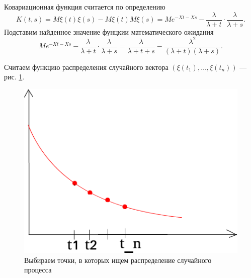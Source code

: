 Ковариационная функция считается по определению
$$K \left( t, s \right) =
  M \xi \left( t \right) \xi \left( s \right) - M \xi \left( t \right) M \xi \left( s \right) =
  Me^{-Xt - Xs} - \frac{ \lambda }{ \lambda + t} \cdot \frac{ \lambda }{ \lambda + s}.$$
Подставим найденное значение фунцкии математического ожидания
$$Me^{-Xt - Xs} - \frac{ \lambda }{ \lambda + t} \cdot \frac{ \lambda }{ \lambda + s} =
  \frac{ \lambda }{ \lambda + t + s} -
  \frac{ \lambda^2}{ \left( \lambda + t \right) \left( \lambda + s \right) }.$$

Считаем функцию распределения случайного вектора
$ \left( \xi \left( t_1 \right), \dotsc, \xi \left( t_n \right) \right) $ --- рис. \ref{fig:231}.

\begin{figure}[h!]
  \centering
  \includegraphics[width=.4\textwidth]{./pictures/2_3_1.png}
  \caption{Выбираем точки, в которых ищем распределение случайного процесса}
  \label{fig:231}
\end{figure}

